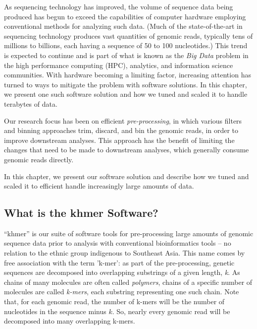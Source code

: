\documentclass{article}
\begin{document}

As sequencing technology has improved, the volume of sequence data being
produced has begun to exceed the capabilities of computer hardware employing
conventional methods for analyzing such data. (Much of the state-of-the-art in
sequencing technology produces vast quantities of genomic reads, typically tens
of millions to billions, each having a sequence of 50 to 100 nucleotides.) This
trend is expected to continue and is part of what is known as the \textit{Big
Data} \citep{web:bigdata} problem in the high performance computing (HPC),
analytics, and information science communities.  With hardware becoming a
limiting factor, increasing attention has turned to ways to mitigate the
problem with software solutions.  In this chapter, we present one such software
solution and how we tuned and scaled it to handle terabytes of data.

Our research focus has been on efficient {\em pre-processing}, in which
various filters and binning approaches trim, discard, and bin the
genomic reads, in order to improve downstream analyses.  This approach
has the benefit of limiting the changes that need to be made to downstream
analyses, which generally consume genomic reads directly.


In this chapter, we present our software solution and describe how we
tuned and scaled it to efficient handle increasingly large amounts of
data.

\subsection{What is the khmer Software?}

``khmer'' is our suite of software tools for pre-processing large
amounts of genomic sequence data prior to analysis with conventional
bioinformatics tools \citep{web:khmer} -- no relation to the ethnic
group indigenous to Southeast Asia.  This name comes by free
association with the term 'k-mer': as part of the pre-processing,
genetic sequences are decomposed into overlapping substrings of a
given length, \textit{k}. As chains of many molecules are often called
\textit{polymers}, chains of a specific number of molecules are called
\textit{k-mers}, each substring representing one such chain.  Note
that, for each genomic read, the number of k-mers will be the number
of nucleotides in the sequence minus $k$. So, nearly
every genomic read will be decomposed into many overlapping k-mers.
\end{document}
